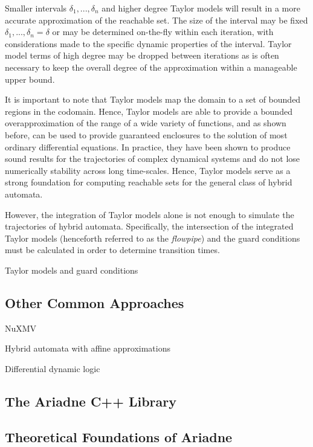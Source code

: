 Smaller intervals $\delta_1, ..., \delta_n$ and higher degree Taylor models will result in a more accurate approximation of the reachable set. The size of the interval may be fixed $\delta_1, ..., \delta_n = \delta$ or may be determined on-the-fly within each iteration, with considerations made to the specific dynamic properties of the interval. Taylor model terms of high degree may be dropped between iterations as is often necessary to keep the overall degree of the approximation within a manageable upper bound.

It is important to note that Taylor models map the domain to a set of bounded regions in the codomain. Hence, Taylor models are able to provide a bounded overapproximation of the range of a wide variety of functions, and as shown before, can be used to provide guaranteed enclosures to the solution of most ordinary differential equations. In practice, they have been shown to produce sound results for the trajectories of complex dynamical systems and do not lose numerically stability across long time-scales. Hence, Taylor models serve as a strong foundation for computing reachable sets for the general class of hybrid automata.

However, the integration of Taylor models alone is not enough to simulate the trajectories of hybrid automata. Specifically, the intersection of the integrated Taylor models (henceforth referred to as the \textit{flowpipe}) and the guard conditions must be calculated in order to determine transition times.


Taylor models and guard conditions

\subsection{Other Common Approaches}

NuXMV

Hybrid automata with affine approximations

Differential dynamic logic

\subsection{The Ariadne C++ Library}

\subsection{Theoretical Foundations of Ariadne}

